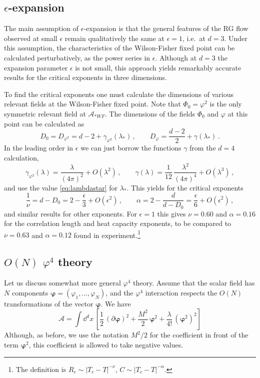\subsection*{\texorpdfstring{$\epsilon$}{epsilon}-expansion}

The main assumption of $\epsilon$-expansion is that the general features of the
RG flow observed at small $\epsilon$ remain qualitatively the same at
$\epsilon=1$, i.e.\ at $d=3$. Under this assumption, the characteristics of the
Wilson-Fisher fixed point can be calculated perturbatively, as the power series in
$\epsilon$. Although at $d=3$ the expansion parameter $\epsilon$ is not small,
this approach yields remarkably accurate results for the critical exponents in
three dimensions.

To find the critical exponents one must calculate the dimensions of various
relevant fields at the Wilson-Fisher fixed point. Note that $\Phi_0=\varphi^2$ is
the only symmetric relevant field at $\mathcal A_{*WF}$. The dimensions of the
fields $\Phi_0$ and $\varphi$ at this point can be calculated as
\[
D_0=D_{\varphi^2}=d-2+\gamma_{\varphi^2}(\lambda_*)\,,\qquad
D_\varphi=\frac{d-2}2+\gamma(\lambda_*)\,.
\]
In the leading order in $\epsilon$ we can just borrow the functions $\gamma$ from
the $d=4$ calculation,
\[
\gamma_{\varphi^2}(\lambda)=\frac\lambda{(4\pi)^2}+O(\lambda^2)\,,\qquad
\gamma(\lambda)=\frac1{12}\,\frac{\lambda^2}{(4\pi)^4}+O(\lambda^3)\,,
\]
and use the value \eqref{eq:lambdastar} for $\lambda_*$. This yields for the
critical exponents
\[
\frac1\nu=d-D_0=2-\frac\epsilon3+O(\epsilon^2)\,,\qquad
\alpha=2-\frac d{d-D_0}=\frac\epsilon6+O(\epsilon^2)\,,
\]
and similar results for other exponents. For $\epsilon=1$ this gives $\nu=0.60$
and $\alpha=0.16$ for the correlation length and heat capacity exponents, to be
compared to $\nu=0.63$ and $\alpha=0.12$ found in experiment.\footnote{The
definition is $R_c\sim|T_c-T|^{-\nu}$, $C\sim|T_c-T|^{-\alpha}$.}

\subsection*{\texorpdfstring{$O(N)$ $\varphi^4$}{O(N) phi**4} theory}

Let us discuss somewhat more general $\varphi^4$ theory. Assume that the scalar
field has $N$ components $\bm{\varphi}=(\varphi_1,\dots,\varphi_N)$, and the
$\varphi^4$ interaction respects the $O(N)$ transformations of the vector
$\bm{\varphi}$. We have
\[
\mathcal A=\int \dd^dx\,\left[\frac12\,(\partial\bm{\varphi})^2+\frac{M^2}2\,\bm{\varphi}^2+\frac\lambda{4!}\,(\bm{\varphi}^2)^2\right]
\]
Although, as before, we use the notation $M^2/2$ for the coefficient in front of
the term $\bm{\varphi}^2$, this coefficient is allowed to take negative values.


